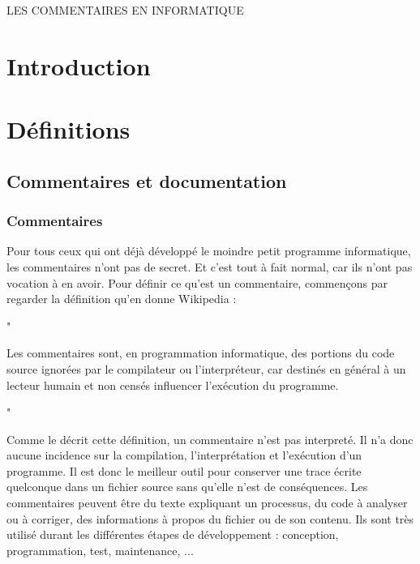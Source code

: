 \documentclass[10pt,a4paper,twoside, openany]{report}
\begin{document}
\begin{titlepage}
\begin{LARGE}
LES COMMENTAIRES EN INFORMATIQUE
\end{LARGE}
\end{titlepage}

\chapter*{Introduction}

\paragraph{}

\chapter{D\'efinitions}

\section{Commentaires et documentation}

\subsection{Commentaires}

Pour tous ceux qui ont d\'ej\`a d\'evelopp\'e le moindre petit programme informatique, les commentaires n'ont pas de secret. Et c'est tout \`a fait normal, car ils n'ont pas vocation \`a en avoir. Pour d\'efinir ce qu'est un commentaire, commen\c cons par regarder la d\'efinition qu'en donne Wikipedia :

\begin{quoting}
\begin{large}"\end{large}
Les commentaires sont, en programmation informatique, des portions du code source ignor\'ees par le compilateur ou l'interpr\'eteur, car destin\'es en g\'en\'eral \`a un lecteur humain et non cens\'es influencer l'ex\'ecution du programme.
\begin{large}"\end{large}
\end{quoting}

Comme le d\'ecrit cette d\'efinition, un commentaire n'est pas interpret\'e. Il n'a donc aucune incidence sur la compilation, l'interpr\'etation et l'ex\'ecution d'un programme. Il est donc le meilleur outil pour conserver une trace \'ecrite quelconque dans un fichier source sans qu'elle n'est de cons\'equences. Les commentaires peuvent \^etre du texte expliquant un processus, du code \`a analyser ou \`a corriger, des informations \`a propos du fichier ou de son contenu. Ils sont tr\`es utilis\'e durant les diff\'erentes \'etapes de d\'eveloppement : conception, programmation, test, maintenance, ...\newline
\end{document}
